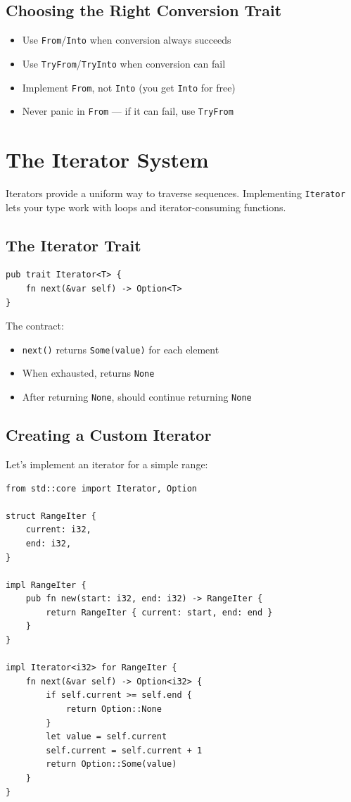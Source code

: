 \subsection{Choosing the Right Conversion Trait}

\begin{itemize}
    \item Use \texttt{From}/\texttt{Into} when conversion always succeeds
    \item Use \texttt{TryFrom}/\texttt{TryInto} when conversion can fail
    \item Implement \texttt{From}, not \texttt{Into} (you get \texttt{Into} for free)
    \item Never panic in \texttt{From} --- if it can fail, use \texttt{TryFrom}
\end{itemize}


\section{The Iterator System}
\label{sec:iterators}

Iterators provide a uniform way to traverse sequences. Implementing \texttt{Iterator} lets your type work with loops and iterator-consuming functions.

\subsection{The Iterator Trait}

\begin{lstlisting}
pub trait Iterator<T> {
    fn next(&var self) -> Option<T>
}
\end{lstlisting}

The contract:
\begin{itemize}
    \item \texttt{next()} returns \texttt{Some(value)} for each element
    \item When exhausted, returns \texttt{None}
    \item After returning \texttt{None}, should continue returning \texttt{None}
\end{itemize}

\subsection{Creating a Custom Iterator}

Let's implement an iterator for a simple range:

\begin{lstlisting}
from std::core import Iterator, Option

struct RangeIter {
    current: i32,
    end: i32,
}

impl RangeIter {
    pub fn new(start: i32, end: i32) -> RangeIter {
        return RangeIter { current: start, end: end }
    }
}

impl Iterator<i32> for RangeIter {
    fn next(&var self) -> Option<i32> {
        if self.current >= self.end {
            return Option::None
        }
        let value = self.current
        self.current = self.current + 1
        return Option::Some(value)
    }
}
\end{lstlisting}

